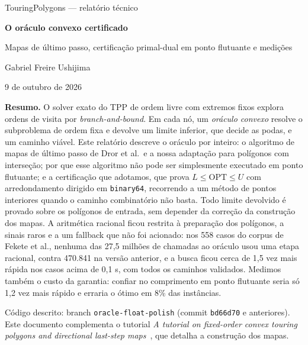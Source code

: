 \documentclass[11pt,a4paper]{article}
\theoremstyle{plain}\newtheorem{proposicao}{Proposição}
\theoremstyle{definition}\newtheorem{definicao}{Definição}
\theoremstyle{plain}\newtheorem{teorema}{Teorema}
\newcommand{\OPT}{\mathrm{OPT}}
\newcommand{\code}[1]{\texttt{\small #1}}
\begin{document}

\begin{titlepage}
\vspace*{18mm}
{\color{quiet}\sffamily\small TouringPolygons --- relatório técnico\par}
\vspace{6mm}
{\color{navy}\bfseries\fontsize{24}{29}\selectfont O oráculo convexo certificado\par}
\vspace{3mm}
{\color{good}\Large Mapas de último passo, certificação primal-dual em ponto flutuante e medições\par}
\vspace{10mm}
{\large Gabriel Freire Ushijima\par}
{\color{quiet}9 de outubro de 2026\par}
\vspace{14mm}
\begin{tcolorbox}[colback=navy!3,colframe=navy!40,boxrule=.5pt,arc=2pt,left=8pt,right=8pt,top=6pt,bottom=6pt]
\textbf{Resumo.} O solver exato do TPP de ordem livre com extremos fixos explora ordens de visita por \emph{branch-and-bound}. Em cada nó, um \emph{oráculo convexo} resolve o subproblema de ordem fixa e devolve um limite inferior, que decide as podas, e um caminho viável. Este relatório descreve o oráculo por inteiro: o algoritmo de mapas de último passo de Dror et al.\ e a nossa adaptação para polígonos com interseção; por que esse algoritmo não pode ser simplesmente executado em ponto flutuante; e a certificação que adotamos, que prova \(L\le\OPT\le U\) com arredondamento dirigido em \texttt{binary64}, recorrendo a um método de pontos interiores quando o caminho combinatório não basta. Todo limite devolvido é provado sobre os polígonos de entrada, sem depender da correção da construção dos mapas. A aritmética racional ficou restrita à preparação dos polígonos, a sinais raros e a um fallback que não foi acionado: nos 558 casos do corpus de Fekete et al., nenhuma das 27,5 milhões de chamadas ao oráculo usou uma etapa racional, contra 470.841 na versão anterior, e a busca ficou cerca de 1,5 vez mais rápida nos casos acima de 0,1 s, com todos os caminhos validados. Medimos também o custo da garantia: confiar no comprimento em ponto flutuante seria só 1,2 vez mais rápido e erraria o ótimo em 8\% das instâncias.
\end{tcolorbox}
\vfill
{\small\color{quiet}Código descrito: branch \code{oracle-float-polish} (commit \code{bd66d70} e anteriores). Este documento complementa o tutorial \emph{A tutorial on fixed-order convex touring polygons and directional last-step maps}~\cite{tutorial}, que detalha a construção dos mapas.\par}
\end{titlepage}
\end{document}
